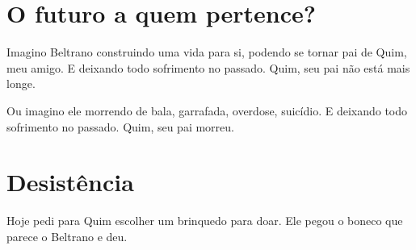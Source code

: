 \chapter{O futuro a quem pertence?}\label{o-futuro-a-quem-pertence}


Imagino Beltrano construindo uma vida para si, podendo se tornar pai de
Quim, meu amigo. E deixando todo sofrimento no passado. Quim, seu pai
não está mais longe.

Ou imagino ele morrendo de bala, garrafada, overdose, suicídio. E
deixando todo sofrimento no passado. Quim, seu pai morreu.

\chapter{Desistência}\label{desistuxeancia}

Hoje pedi para Quim escolher um brinquedo para doar. Ele pegou o boneco
que parece o Beltrano e deu.

